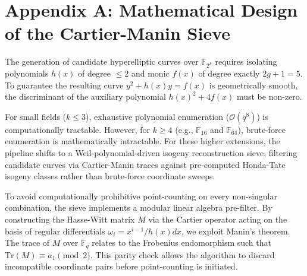 \documentclass[letterpaper, 11pt]{article}
\begin{document}
\appendix

\section{Appendix A: Mathematical Design of the Cartier-Manin Sieve}
The generation of candidate hyperelliptic curves over $\mathbb{F}_{2^k}$ requires isolating polynomials $h(x)$ of degree $\le 2$ and monic $f(x)$ of degree exactly $2g+1=5$. To guarantee the resulting curve $y^2 + h(x)y = f(x)$ is geometrically smooth, the discriminant of the auxiliary polynomial $h(x)^2 + 4f(x)$ must be non-zero. 

For small fields ($k \le 3$), exhaustive polynomial enumeration ($\mathcal{O}(q^8)$) is computationally tractable. However, for $k \ge 4$ (e.g., $\mathbb{F}_{16}$ and $\mathbb{F}_{64}$), brute-force enumeration is mathematically intractable. For these higher extensions, the pipeline shifts to a Weil-polynomial-driven isogeny reconstruction sieve, filtering candidate curves via Cartier-Manin traces against pre-computed Honda-Tate isogeny classes rather than brute-force coordinate sweeps.

To avoid computationally prohibitive point-counting on every non-singular combination, the sieve implements a modular linear algebra pre-filter. By constructing the Hasse-Witt matrix $M$ via the Cartier operator acting on the basis of regular differentials $\omega_i = x^{i-1}/h(x) dx$, we exploit Manin's theorem. The trace of $M$ over $\mathbb{F}_q$ relates to the Frobenius endomorphism such that $\text{Tr}(M) \equiv a_1 \pmod 2$. This parity check allows the algorithm to discard incompatible coordinate pairs before point-counting is initiated. 
\end{document}
